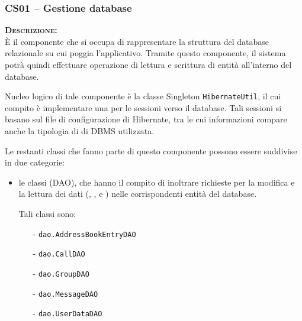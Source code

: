 \subsubsection{CS01 -- Gestione database}\label{sec:cs01}
\begin{description}
\item{\scshape\bfseries Descrizione:}\\
È il componente che si occupa di rappresentare la struttura del database relazionale su cui poggia l'applicativo. Tramite questo componente, il sistema potrà quindi effettuare operazione di lettura e scrittura di entità all'interno del database.

Nucleo logico di tale componente è la classe Singleton \texttt{HibernateUtil}, il cui compito è implementare una  per le sessioni verso il database. Tali sessioni si basano sul file di configurazione di Hibernate, tra le cui informazioni compare anche la tipologia di di DBMS utilizzata.

Le restanti classi che fanno parte  di questo componente possono essere suddivise in due categorie:
\begin{itemize}
	\item le classi  (DAO), che hanno il compito di inoltrare richieste per la modifica e la lettura dei dati (, ,  e ) nelle corrispondenti entità del database.
	
	Tali classi sono:
	\begin{itemize}
	  \item[-] \texttt{dao.AddressBookEntryDAO}
		\item[-] \texttt{dao.CallDAO}
		\item[-] \texttt{dao.GroupDAO}
		\item[-] \texttt{dao.MessageDAO}
		\item[-] \texttt{dao.UserDataDAO}
	\end{itemize}
	

\end{itemize}
\end{description}
